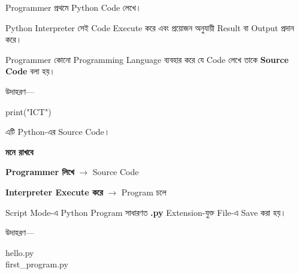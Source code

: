 Programmer প্রথমে Python Code লেখে।

Python Interpreter সেই Code Execute করে এবং প্রয়োজন অনুযায়ী
Result বা Output প্রদান করে।



\begin{definitionbox}

Programmer কোনো Programming Language ব্যবহার করে যে Code
লেখে তাকে \textbf{Source Code} বলা হয়।

\end{definitionbox}

উদাহরণ—

\begin{codebox}

\begin{english}
\ttfamily
print("ICT")
\end{english}

\end{codebox}

এটি Python-এর Source Code।

\begin{rememberbox}

\textbf{\color{deepOrange}মনে রাখবে}

\textbf{Programmer লিখে}
\(\longrightarrow\)
Source Code

\medskip

\textbf{Interpreter Execute করে}
\(\longrightarrow\)
Program চলে

\end{rememberbox}



Script Mode-এ Python Program সাধারণত
\textbf{\textenglish{\ttfamily .py}}
Extension-যুক্ত File-এ Save করা হয়।

উদাহরণ—

\begin{codebox}

\begin{english}
\ttfamily
hello.py\\
first\_program.py
\end{english}

\end{codebox}

